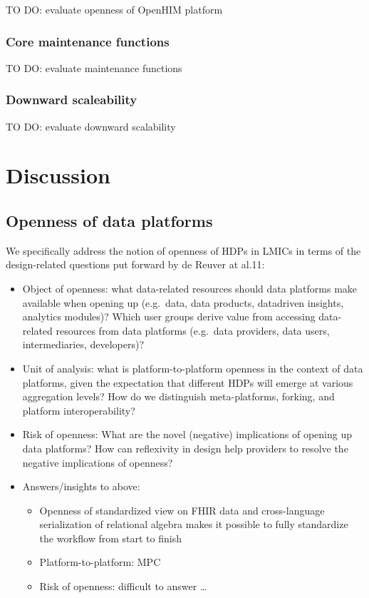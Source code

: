 \documentclass[
  authoryear]{elsarticle}
\providecommand{\tightlist}{%
  \setlength{\itemsep}{0pt}\setlength{\parskip}{0pt}}\usepackage{longtable,booktabs,array}
\begin{document}
TO DO: evaluate openness of OpenHIM platform

\subsubsection{Core maintenance
functions}\label{core-maintenance-functions-2}

TO DO: evaluate maintenance functions

\subsubsection{Downward scaleability}\label{downward-scaleability-2}

TO DO: evaluate downward scalability

\section{Discussion}\label{discussion}

\subsection{Openness of data
platforms}\label{openness-of-data-platforms}

We specifically address the notion of openness of HDPs in LMICs in terms
of the design-related questions put forward by de Reuver at al.11:

\begin{itemize}
\tightlist
\item
  Object of openness: what data-related resources should data platforms
  make available when opening up (e.g.~data, data products, datadriven
  insights, analytics modules)? Which user groups derive value from
  accessing data-related resources from data platforms (e.g.~data
  providers, data users, intermediaries, developers)?
\item
  Unit of analysis: what is platform-to-platform openness in the context
  of data platforms, given the expectation that different HDPs will
  emerge at various aggregation levels? How do we distinguish
  meta-platforms, forking, and platform interoperability?
\item
  Risk of openness: What are the novel (negative) implications of
  opening up data platforms? How can reflexivity in design help
  providers to resolve the negative implications of openness?
\item
  Answers/insights to above:

  \begin{itemize}
  \tightlist
  \item
    Openness of standardized view on FHIR data and cross-language
    serialization of relational algebra makes it possible to fully
    standardize the workflow from start to finish
  \item
    Platform-to-platform: MPC
  \item
    Risk of openness: difficult to answer \ldots{}
  \end{itemize}
\end{itemize}
\end{document}
